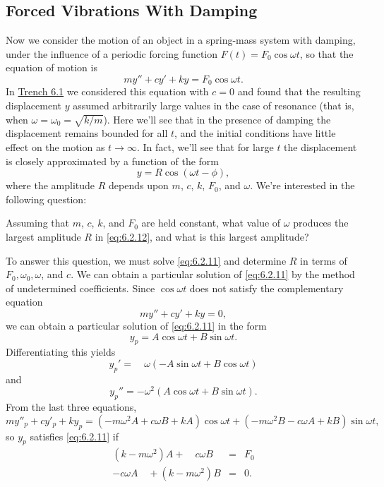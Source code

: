 \documentclass{ximera}
\begin{document}
\subsection*{Forced Vibrations With Damping}
 
Now we consider the motion of an object in a spring-mass system with
damping, under the influence of a periodic forcing function
$F(t)=F_0\cos\omega t$, so that the equation of motion is
\begin{equation}\label{eq:6.2.11}
my''+cy'+ky=F_0\cos\omega t.
\end{equation}
In \href{https://ximera.osu.edu/ode/main/springProblemsI/springProblemsI}{Trench 6.1} we considered this equation with $c=0$ and
found that the resulting displacement $y$ assumed arbitrarily large
values in the case of resonance   (that is, when
$\omega=\omega_0=\sqrt{k/m}$). Here we'll see that in the presence
of damping the displacement remains bounded for all $t$, and the
initial conditions have little effect on the motion as $t\rightarrow\infty$.
In fact, we'll see that for large $t$ the displacement is closely
approximated by a function of the form
\begin{equation}\label{eq:6.2.12}
y=R\cos(\omega t-\phi),
\end{equation}
where the amplitude $R$ depends upon $m$, $c$, $k$, $F_0$, and
$\omega$. We're interested in the following question:
 
Assuming that $m$, $c$, $k$, and $F_0$ are
held constant, what value of $\omega$ produces the largest amplitude
$R$ in \eqref{eq:6.2.12}, and what is this largest amplitude?
 
To answer this question, we must solve \eqref{eq:6.2.11} and determine $R$ in
terms of $F_0,\omega_0,\omega$, and $c$. We can obtain a particular
solution of \eqref{eq:6.2.11} by the method of undetermined coefficients.
Since $\cos\omega t$ does not satisfy the complementary equation
$$
my''+cy'+ky=0,
$$
we can obtain a particular solution of \eqref{eq:6.2.11} in the form
\begin{equation}\label{eq:6.2.13}
y_p=A\cos\omega t+B\sin\omega t.
\end{equation}
Differentiating this yields
$$
y_p'=\quad\omega (-A\sin\omega t+B\cos\omega t)
$$
and
$$
y_p''=-\omega^2(A\cos\omega t+B\sin\omega t).
$$
 From the last three equations,
$$
my''_p+cy'_p+ky_p=(-m\omega^2A+c\omega B+kA)\cos\omega t+
(-m\omega^2 B-c\omega A+kB)\sin\omega t,
$$
so $y_p$ satisfies  \eqref{eq:6.2.11}  if
$$
\begin{array}{lll}
(k-m\omega^2) A+\quad c\omega B &=&F_0\\
-c\omega A\quad+(k-m\omega^2)B&=&0.
\end{array}
$$
 
\end{document}
